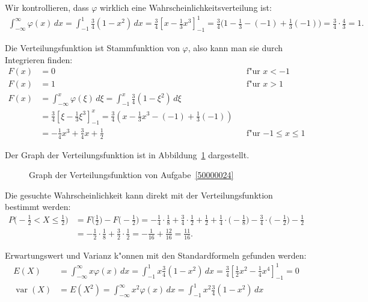 \begin{loesung}
Wir kontrollieren, dass $\varphi$ wirklich eine Wahrscheinlichkeitsverteilung
ist:
\begin{align*}
\int_{-\infty}^{\infty}\varphi(x)\,dx
=
\int_{-1}^1 \frac34(1-x^2)\,dx
=
\frac34\left[
x-\frac13x^3
\right]_{-1}^1
=
\frac34\biggl(1-\frac13-(-1)+\frac13(-1)\biggr)
=
\frac34\cdot\frac43
=1.
\end{align*}
\begin{teilaufgaben}
\item Die Verteilungsfunktion ist Stammfunktion von $\varphi$, also kann man sie
durch Integrieren finden:
\begin{align*}
F(x)&=0&&\text{f"ur $x < -1$}\\
F(x)&=1&&\text{f"ur $x > 1$}\\
F(x)&=\int_{-\infty}^x\varphi(\xi)\,d\xi =\int_{-1}^x\frac34(1-\xi^2)\,d\xi
\\
&=
\frac34\left[
\xi -\frac13\xi^3
\right]_{-1}^x
=\frac34(x-\frac13x^3-(-1)+\frac13(-1))
\\
&=-\frac14x^3+\frac34x+\frac12&&\text{f"ur $-1\le x\le 1$}
\end{align*}
\item Der Graph der Verteilungsfunktion ist in
Abbildung~\ref{50000024:verteilungsfunktion} dargestellt.
\begin{figure}
\centering
{}
\caption{Graph der Verteilungsfunktion von Aufgabe~\ref{50000024}
\label{50000024:verteilungsfunktion}}
\end{figure}
\item Die gesuchte Wahrscheinlichkeit kann direkt mit der Verteilungsfunktion
bestimmt werden:
\begin{align*}
P\biggl(-\frac12<X\le \frac12\biggr)
&=
F\biggl(\frac12\biggr)-F\biggl(-\frac12\biggr)
=
-\frac14\cdot\frac18+\frac34\cdot\frac12+\frac12
+\frac14\cdot\biggl(-\frac18\biggr)-\frac34\cdot\biggl(-\frac12\biggr)-\frac12
\\
&=-\frac12\cdot\frac18+\frac32\cdot\frac12
=
-\frac1{16}+\frac{12}{16}
=
\frac{11}{16}.
\end{align*}
\item Erwartungswert und Varianz k"onnen mit den Standardformeln gefunden 
werden:
\begin{align*}
E(X)&=
\int_{-\infty}^{\infty}x\varphi(x)\,dx=\int_{-1}^1x \frac34(1-x^2)\,dx
=\frac34\left[\frac12x^2-\frac14x^4\right]_{-1}^1
=0\\
\operatorname{var}(X)&=E(X^2)=
\int_{-\infty}^{\infty}x^2\varphi(x)\,dx=\int_{-1}^1x^2\frac34(1-x^2)\,dx

\end{align*}
\end{teilaufgaben}
\end{loesung}
